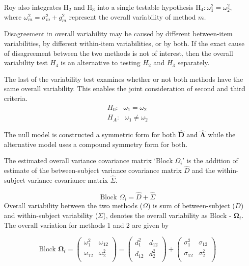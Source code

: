 \documentclass[12pt, a4paper]{report}
\theoremstyle{plain}
\theoremstyle{definition}
\theoremstyle{remark}
\begin{document}
	Roy also integrates $\mathrm{H}_2$ and $\mathrm{H}_3$ into a single testable hypothesis $\mathrm{H}_4\colon \omega^2_1=\omega^2_2,$ where $\omega^2_m = \sigma^2_m + g^2_m$ represent the overall variability of method $m.$ 
	
	
	Disagreement in overall variability may be caused by different between-item variabilities, by different within-item variabilities, or by both.  If the exact cause of disagreement between the two methods is not of interest, then the overall variability test $H_4$ is an alternative to testing $H_2$ and $H_3$ separately.
		
	
	The last of the variability test examines whether or not both methods have the same overall variability. This enables the joint consideration of second and third criteria.
	\begin{eqnarray*}
		H_{0}: \mbox{ }\omega_{1}  = \omega_{2} \\
		H_{A}: \mbox{ }\omega_{1}  \neq \omega_{2}
	\end{eqnarray*}
	
	The null model is constructed a symmetric form for both $\boldsymbol{\hat{D}}$ and $\boldsymbol{\hat{\Lambda}}$ while the alternative model uses a compound symmetry form for both.
	
	
	The estimated overall variance covariance matrix `Block
	$\Omega_{i}$' is the addition of estimate of the between-subject variance covariance matrix $\hat{D}$ and the within-subject variance covariance matrix $\hat{\Sigma}$.
	
	\begin{equation}
	\mbox{Block  }\Omega_{i} = \hat{D} + \hat{\Sigma}
	\end{equation}
	Overall variability between the two methods ($\Omega$) is sum of between-subject ($D$) and within-subject variability ($\Sigma$),
	\citet{ARoy2009} denotes the overall variability	as ${\mbox{Block - }\boldsymbol \Omega_{i}}$. The overall variation for methods $1$ and $2$ are given by
	
	\begin{center}
		\[\mbox{Block } \boldsymbol{\Omega}_i = \left(\begin{array}{cc}
		\omega^2_1  & \omega_{12} \\
		\omega_{12} & \omega^2_2 \\
		\end{array}  \right)
		=  \left(
		\begin{array}{cc}
		d^2_1  & d_{12} \\
		d_{12} & d^2_2 \\
		\end{array} \right)+
		\left(
		\begin{array}{cc}
		\sigma^2_1  & \sigma_{12} \\
		\sigma_{12} & \sigma^2_2 \\
		\end{array}\right)
		\]
	\end{center}
	
\end{document}
